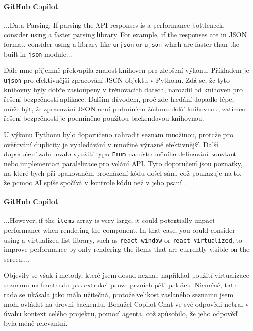 \documentclass[FM,DP]{tulthesis}
\begin{document}
		\vspace{0.6em}
		\begin{tcolorbox}[colback=white,colframe=black]
			\paragraph{GitHub Copilot}
			...Data Parsing: If parsing the API responses is a performance bottleneck, consider using a faster parsing library. For example, if the responses are in JSON format, consider using a library like \verb|orjson| or \verb|ujson| which are faster than the built-in \verb|json| module... \cite{enum}
		\end{tcolorbox}
		
		Dále mne příjemně překvapila znalost knihoven pro zlepšení výkonu. Příkladem je \verb|ujson| pro efektivnější zpracování JSON objektu v Pythonu. Zdá se, že tyto knihovny byly dobře zastoupeny v trénovacích datech, narozdíl od knihoven pro řešení bezpečnosti aplikace. Dalším důvodem, proč zde hledání dopadlo lépe, může být, že zpracování JSON není podmíněno žádnou další knihovnou, zatímco řešení bezpečnosti je podmíněno použitou backendovou knihovnou.
		
		U výkonu Pythonu bylo doporučeno nahradit seznam množinou, protože pro ověřování duplicity je vyhledávání v množině výrazně efektivnější. Další doporučení zahrnovalo využití typu \verb|Enum| namísto ručního definování konstant nebo implementaci paralelizace pro volání API. Tyto doporučení jsou poznatky, na které bych při opakovaném procházení kódu došel sám, což poukazuje na to, že pomoc AI spíše spočívá v kontrole kódu než v jeho psaní \cite{meteo_parser} \cite{enum} \cite{dataclass}.
		
		\vspace{0.6em}
		\begin{tcolorbox}[colback=white,colframe=black]
			\paragraph{GitHub Copilot}
			...However, if the \verb|items| array is very large, it could potentially impact performance when rendering the component. In that case, you could consider using a virtualized list library, such as \verb|react-window| or \verb|react-virtualized|, to improve performance by only rendering the items that are currently visible on the screen.... \cite{enum}
		\end{tcolorbox}
		
		
		Objevily se však i metody, které jsem dosud neznal, například použití virtualizace seznamu na frontendu pro extrakci pouze prvních pěti položek. Nicméně, tato rada se ukázala jako málo užitečná, protože velikost zaslaného seznamu jsem mohl ovládat na úrovni backendu. Bohužel Copilot Chat ve své odpovědi nebral v úvahu kontext celého projektu, pomocí agenta, což způsobilo, že jeho odpověď byla méně relevantní.
		
\end{document}
